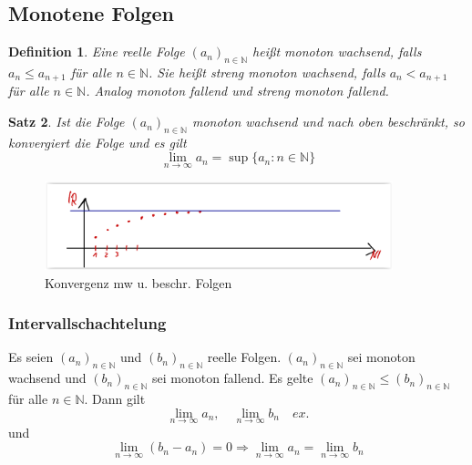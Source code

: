 \documentclass[12pt,a4paper]{article}%
\newtheorem{satz}{Satz}[section]
\newtheorem{definition}[satz]{Definition}
\numberwithin{equation}{section}
\newcommand{\N}{\mathbb{N}}
\numberwithin{equation}{subsection}
\begin{document}
  \subsection{Monotene Folgen}
  \begin{definition}
    Eine reelle Folge $(a_n)_{n \in \N}$ heißt monoton wachsend, falls $a_n \leq a_{n+1}$ für alle $n \in \N$. Sie heißt streng monoton wachsend, falls $a_n < a_{n+1}$ für alle $n \in \N$. Analog monoton fallend und streng monoton fallend.
  \end{definition}
  \begin{satz}
    Ist die Folge $(a_n)_{n \in \N}$ monoton wachsend und nach oben beschränkt, so konvergiert die Folge und es gilt
    \begin{equation}
      \lim_{n\rightarrow \infty} a_n = \sup \lbrace a_n : n\in \N \rbrace
    \end{equation}
  \end{satz}
  \begin{figure}[htbp] 
	  \centering
	  \includegraphics[width=0.9\textwidth]{folge_monoton_beschraenkt.png}
	  \caption{Konvergenz mw u. beschr. Folgen\protect\cite{HM12}}
	  \label{fig:folge_mw_beschr}
	\end{figure}
	
		\subsubsection{Intervallschachtelung}
		Es seien $(a_n)_{n \in \N}$ und $(b_n)_{n \in \N}$ reelle Folgen.
		$(a_n)_{n \in \N}$ sei monoton wachsend und $(b_n)_{n \in \N}$ sei monoton fallend. Es gelte $(a_n)_{n \in \N} \leq (b_n)_{n \in \N}$ für alle $n \in \N$.
    Dann gilt 
    \begin{equation*}
      \lim_{n \rightarrow \infty} a_n,\quad \lim_{n \rightarrow \infty} b_n \quad ex.
    \end{equation*}
    und
    \begin{equation}
      \lim_{n \rightarrow \infty} (b_n - a_n) = 0 \Rightarrow \lim_{n \rightarrow \infty} a_n = \lim_{n \rightarrow \infty} b_n
    \end{equation}
\newpage
\end{document}
